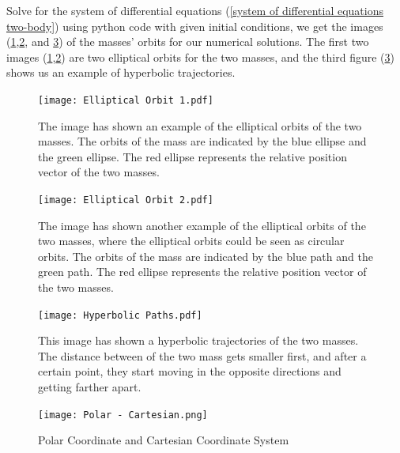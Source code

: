 Solve for the system of differential equations (\ref{system of differential equations two-body}) using python code with given initial conditions, we get the images (\ref{fig:Elliptical Orbit 1},\ref{fig:Elliptical Orbit 2}, and \ref{fig:Hyperbolic Paths}) of the masses' orbits for our numerical solutions. The first two images  (\ref{fig:Elliptical Orbit 1},\ref{fig:Elliptical Orbit 2}) are two elliptical orbits for the two masses, and the third figure (\ref{fig:Hyperbolic Paths}) shows us an example of hyperbolic trajectories.

\begin{figure}
    \texttt{[image: Elliptical Orbit 1.pdf]}
    \caption{The image has shown an example of the elliptical orbits of the two masses. The orbits of the mass are indicated by the blue ellipse and the green ellipse. The red ellipse represents the relative position vector of the two masses.}\label{fig:Elliptical Orbit 1}
\end{figure}

\begin{figure}
\caption{The image has shown another example of the elliptical orbits of the two masses, where the elliptical orbits could be seen as circular orbits. The orbits of the mass are indicated by the blue path and the green path. The red ellipse represents the relative position vector of the two masses.}\label{fig:Elliptical Orbit 2}
\texttt{[image: Elliptical Orbit 2.pdf]}
\end{figure}

\begin{figure}
\caption{This image has shown a hyperbolic trajectories of the two masses. The distance between of the two mass gets smaller first, and after a certain point, they start moving in the opposite directions and getting farther apart.}\label{fig:Hyperbolic Paths}
\texttt{[image: Hyperbolic Paths.pdf]}
\end{figure}

\newpage

\begin{figure}
    \centering
    \texttt{[image: Polar - Cartesian.png]}
    \caption{Polar Coordinate and Cartesian Coordinate System}
    \label{fig:Polar - Cartesian}
\end{figure}

\newpage

